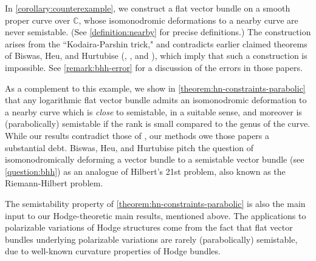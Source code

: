 In \autoref{corollary:counterexample}, we construct a flat vector bundle on a smooth proper curve over $\mathbb{C}$, whose isomonodromic deformations
to a nearby curve
are never semistable.
(See \autoref{definition:nearby} for precise definitions.)
The construction arises from the ``Kodaira-Parshin trick," and contradicts  earlier claimed theorems of Biswas, Heu, and Hurtubise (\cite[Theorem 1.3]{BHH:logarithmic},
\cite[Theorem 1.3]{BHH:irregular}, and
\cite[Theorem 1.2]{BHH:parabolic}), which imply that such a construction is impossible. See \autoref{remark:bhh-error} for a discussion of the errors in those papers.

As a complement to this example, we show in
\autoref{theorem:hn-constraints-parabolic} that any logarithmic flat vector
bundle admits an isomonodromic deformation to a nearby curve which is \emph{close} to semistable,
in a suitable sense,
and moreover is (parabolically) semistable if the rank is small compared to the genus of the curve.
While our results contradict those of \cite{BHH:logarithmic,BHH:irregular,BHH:parabolic}, our methods owe those papers a substantial debt.
Biswas, Heu,
and Hurtubise
pitch the question of isomonodromically deforming a vector bundle to a
semistable vector bundle (see \autoref{question:bhh})
as an
analogue of Hilbert's 21st problem, also known as the Riemann-Hilbert problem.

The semistability property of \autoref{theorem:hn-constraints-parabolic} is also the main
input to our Hodge-theoretic main results, mentioned above.
The applications to polarizable variations of Hodge structures come from the fact that flat vector bundles underlying polarizable variations are rarely (parabolically) semistable, due to well-known curvature properties of Hodge bundles.




